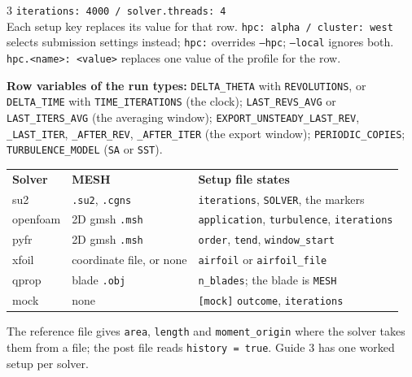 \begin{multicols}{3}
\texttt{iterations: 4000 / solver.threads: 4}\\
Each setup key replaces its value for that row. \texttt{hpc: alpha / cluster: west} selects submission settings instead; \texttt{hpc:} overrides \texttt{--hpc}; \texttt{--local} ignores both. \texttt{hpc.<name>: <value>} replaces one value of the profile for the row.\par\vspace{2pt}
\textbf{Row variables of the run types:} \texttt{DELTA\_THETA} with \texttt{REVOLUTIONS}, or \texttt{DELTA\_TIME} with \texttt{TIME\_ITERATIONS} (the clock); \texttt{LAST\_REVS\_AVG} or \texttt{LAST\_ITERS\_AVG} (the averaging window); \texttt{EXPORT\_UNSTEADY\_LAST\_REV}, \texttt{\_LAST\_ITER}, \texttt{\_AFTER\_REV}, \texttt{\_AFTER\_ITER} (the export window); \texttt{PERIODIC\_COPIES}; \texttt{TURBULENCE\_MODEL} (\texttt{SA} or \texttt{SST}).

\columnbreak
{}
\begin{tabular}{@{}>{\ttfamily}p{12mm}p{25mm}p{41mm}@{}}
\textrm{\textbf{Solver}} & \textbf{MESH} & \textbf{Setup file states}\\
su2 & \texttt{.su2}, \texttt{.cgns} & \texttt{iterations}, \texttt{SOLVER}, the markers\\
openfoam & 2D gmsh \texttt{.msh} & \texttt{application}, \texttt{turbulence}, \texttt{iterations}\\
pyfr & 2D gmsh \texttt{.msh} & \texttt{order}, \texttt{tend}, \texttt{window\_start}\\
xfoil & coordinate file, or none & \texttt{airfoil} or \texttt{airfoil\_file}\\
qprop & blade \texttt{.obj} & \texttt{n\_blades}; the blade is \texttt{MESH}\\
mock & none & \texttt{[mock]} \texttt{outcome}, \texttt{iterations}\\
\end{tabular}\par\vspace{2pt}
The reference file gives \texttt{area}, \texttt{length} and \texttt{moment\_origin} where the solver takes them from a file; the post file reads \texttt{history = true}. Guide 3 has one worked setup per solver.

\end{multicols}
\foot

